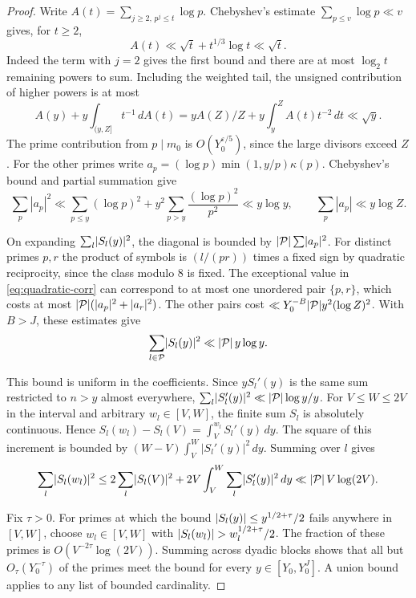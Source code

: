 \begin{proof}

Write \(A(t)=\sum_{j\ge2,\,p^j\le t}\log p\). Chebyshev's estimate
\(\sum_{p\le v}\log p\ll v\) gives, for \(t\ge2\),
\[
 A(t)\ll \sqrt t+t^{1/3}\log t\ll\sqrt t .
\]
Indeed the term with \(j=2\) gives the first bound and there
are at most \(\log_2 t\) remaining powers to sum. Including the
weighted tail, the unsigned contribution of higher powers is at most
\[
 A(y)+y\int_{(y,Z]}t^{-1}\,dA(t)
   =yA(Z)/Z+y\int_y^Z A(t)t^{-2}\,dt\ll\sqrt y .
\]
The prime contribution from \(p\mid m_0\) is
\(O(Y_0^{\varepsilon/5})\), since the large divisors exceed
\(Z\). For the other primes write
\(a_p=(\log p)\min(1,y/p)\kappa(p)\).
Chebyshev's bound and partial summation give
\[
 \sum_p|a_p|^2\ll
  \sum_{p\le y}(\log p)^2+y^2\sum_{p>y}\frac{(\log p)^2}{p^2}
  \ll y\log y,\qquad
 \sum_p|a_p|\ll y\log Z .
\]


On expanding \(\sum_l\lvert S_l(y)\rvert^2\), the diagonal is bounded by
\(\lvert\mathcal P\rvert\sum\lvert a_p\rvert^2\). For distinct primes \(p,r\)
the product of symbols is \((l/(pr))\) times a fixed sign by
quadratic reciprocity, since the class modulo \(8\) is fixed.
The exceptional value in \eqref{eq:quadratic-corr} can correspond
to at most one unordered pair \(\{p,r\}\), which costs at most
\(\lvert\mathcal P\rvert(\lvert a_p\rvert^2+\lvert a_r\rvert^2)\).
The other pairs cost \(\ll Y_0^{-B}\lvert\mathcal P\rvert y^2(\log Z)^2\).
With \(B>J\), these estimates give
\[
 \sum_{l\in\mathcal P}\lvert S_l(y)\rvert^2\ll\lvert\mathcal P\rvert\,y\log y .
\]

This bound is uniform in the coefficients. Since \(yS_l'(y)\)
is the same sum restricted to \(n>y\) almost everywhere,
\(\sum_l\lvert S_l'(y)\rvert^2\ll\lvert\mathcal P\rvert\log y/y\).
For \(V\le W\le2V\) in the interval and arbitrary
\(w_l\in[V,W]\), the finite sum \(S_l\) is absolutely
continuous. Hence \(S_l(w_l)-S_l(V)=\int_V^{w_l}S_l'(y)\,dy\).
The square of this increment is bounded by
\((W-V)\int_V^W|S_l'(y)|^2\,dy\). Summing over \(l\)
gives
\[
 \sum_l\lvert S_l(w_l)\rvert^2
   \le 2\sum_l\lvert S_l(V)\rvert^2+
       2V\int_V^W\sum_l\lvert S'_l(y)\rvert^2\,dy
   \ll\lvert\mathcal P\rvert\,V\log(2V).
\]

Fix \(\tau>0\). For primes at which the bound
\(\lvert S_l(y)\rvert\le y^{1/2+\tau}/2\) fails anywhere in
\([V,W]\), choose \(w_l\in[V,W]\) with \(\lvert S_l(w_l)\rvert>w_l^{1/2+\tau}/2\). The fraction of these
primes is \(O(V^{-2\tau}\log(2V))\). Summing across dyadic blocks
shows that all but \(O_\tau(Y_0^{-\tau})\) of the primes meet the
bound for every \(y\in[Y_0,Y_0^J]\).
A union bound applies to any list of bounded cardinality.

\end{proof}

